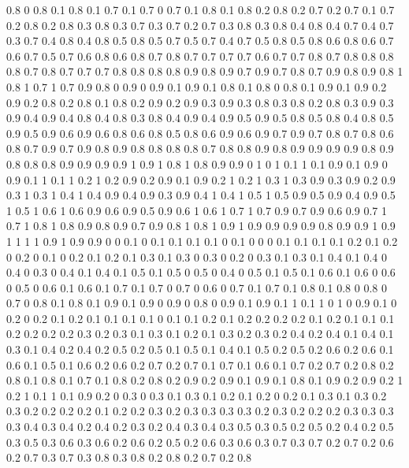 0.8 0
0.8 0.1
0.8 0.1
0.7 0.1
0.7 0
0.7 0.1
0.8 0.1
0.8 0.2
0.8 0.2
0.7 0.2
0.7 0.1
0.7 0.2
0.8 0.2
0.8 0.3
0.8 0.3
0.7 0.3
0.7 0.2
0.7 0.3
0.8 0.3
0.8 0.4
0.8 0.4
0.7 0.4
0.7 0.3
0.7 0.4
0.8 0.4
0.8 0.5
0.8 0.5
0.7 0.5
0.7 0.4
0.7 0.5
0.8 0.5
0.8 0.6
0.8 0.6
0.7 0.6
0.7 0.5
0.7 0.6
0.8 0.6
0.8 0.7
0.8 0.7
0.7 0.7
0.7 0.6
0.7 0.7
0.8 0.7
0.8 0.8
0.8 0.8
0.7 0.8
0.7 0.7
0.7 0.8
0.8 0.8
0.8 0.9
0.8 0.9
0.7 0.9
0.7 0.8
0.7 0.9
0.8 0.9
0.8 1
0.8 1
0.7 1
0.7 0.9
0.8 0
0.9 0
0.9 0.1
0.9 0.1
0.8 0.1
0.8 0
0.8 0.1
0.9 0.1
0.9 0.2
0.9 0.2
0.8 0.2
0.8 0.1
0.8 0.2
0.9 0.2
0.9 0.3
0.9 0.3
0.8 0.3
0.8 0.2
0.8 0.3
0.9 0.3
0.9 0.4
0.9 0.4
0.8 0.4
0.8 0.3
0.8 0.4
0.9 0.4
0.9 0.5
0.9 0.5
0.8 0.5
0.8 0.4
0.8 0.5
0.9 0.5
0.9 0.6
0.9 0.6
0.8 0.6
0.8 0.5
0.8 0.6
0.9 0.6
0.9 0.7
0.9 0.7
0.8 0.7
0.8 0.6
0.8 0.7
0.9 0.7
0.9 0.8
0.9 0.8
0.8 0.8
0.8 0.7
0.8 0.8
0.9 0.8
0.9 0.9
0.9 0.9
0.8 0.9
0.8 0.8
0.8 0.9
0.9 0.9
0.9 1
0.9 1
0.8 1
0.8 0.9
0.9 0
1 0
1 0.1
1 0.1
0.9 0.1
0.9 0
0.9 0.1
1 0.1
1 0.2
1 0.2
0.9 0.2
0.9 0.1
0.9 0.2
1 0.2
1 0.3
1 0.3
0.9 0.3
0.9 0.2
0.9 0.3
1 0.3
1 0.4
1 0.4
0.9 0.4
0.9 0.3
0.9 0.4
1 0.4
1 0.5
1 0.5
0.9 0.5
0.9 0.4
0.9 0.5
1 0.5
1 0.6
1 0.6
0.9 0.6
0.9 0.5
0.9 0.6
1 0.6
1 0.7
1 0.7
0.9 0.7
0.9 0.6
0.9 0.7
1 0.7
1 0.8
1 0.8
0.9 0.8
0.9 0.7
0.9 0.8
1 0.8
1 0.9
1 0.9
0.9 0.9
0.9 0.8
0.9 0.9
1 0.9
1 1
1 1
0.9 1
0.9 0.9
0 0
0.1 0
0.1 0.1
0.1 0.1
0 0.1
0 0
0 0.1
0.1 0.1
0.1 0.2
0.1 0.2
0 0.2
0 0.1
0 0.2
0.1 0.2
0.1 0.3
0.1 0.3
0 0.3
0 0.2
0 0.3
0.1 0.3
0.1 0.4
0.1 0.4
0 0.4
0 0.3
0 0.4
0.1 0.4
0.1 0.5
0.1 0.5
0 0.5
0 0.4
0 0.5
0.1 0.5
0.1 0.6
0.1 0.6
0 0.6
0 0.5
0 0.6
0.1 0.6
0.1 0.7
0.1 0.7
0 0.7
0 0.6
0 0.7
0.1 0.7
0.1 0.8
0.1 0.8
0 0.8
0 0.7
0 0.8
0.1 0.8
0.1 0.9
0.1 0.9
0 0.9
0 0.8
0 0.9
0.1 0.9
0.1 1
0.1 1
0 1
0 0.9
0.1 0
0.2 0
0.2 0.1
0.2 0.1
0.1 0.1
0.1 0
0.1 0.1
0.2 0.1
0.2 0.2
0.2 0.2
0.1 0.2
0.1 0.1
0.1 0.2
0.2 0.2
0.2 0.3
0.2 0.3
0.1 0.3
0.1 0.2
0.1 0.3
0.2 0.3
0.2 0.4
0.2 0.4
0.1 0.4
0.1 0.3
0.1 0.4
0.2 0.4
0.2 0.5
0.2 0.5
0.1 0.5
0.1 0.4
0.1 0.5
0.2 0.5
0.2 0.6
0.2 0.6
0.1 0.6
0.1 0.5
0.1 0.6
0.2 0.6
0.2 0.7
0.2 0.7
0.1 0.7
0.1 0.6
0.1 0.7
0.2 0.7
0.2 0.8
0.2 0.8
0.1 0.8
0.1 0.7
0.1 0.8
0.2 0.8
0.2 0.9
0.2 0.9
0.1 0.9
0.1 0.8
0.1 0.9
0.2 0.9
0.2 1
0.2 1
0.1 1
0.1 0.9
0.2 0
0.3 0
0.3 0.1
0.3 0.1
0.2 0.1
0.2 0
0.2 0.1
0.3 0.1
0.3 0.2
0.3 0.2
0.2 0.2
0.2 0.1
0.2 0.2
0.3 0.2
0.3 0.3
0.3 0.3
0.2 0.3
0.2 0.2
0.2 0.3
0.3 0.3
0.3 0.4
0.3 0.4
0.2 0.4
0.2 0.3
0.2 0.4
0.3 0.4
0.3 0.5
0.3 0.5
0.2 0.5
0.2 0.4
0.2 0.5
0.3 0.5
0.3 0.6
0.3 0.6
0.2 0.6
0.2 0.5
0.2 0.6
0.3 0.6
0.3 0.7
0.3 0.7
0.2 0.7
0.2 0.6
0.2 0.7
0.3 0.7
0.3 0.8
0.3 0.8
0.2 0.8
0.2 0.7
0.2 0.8

